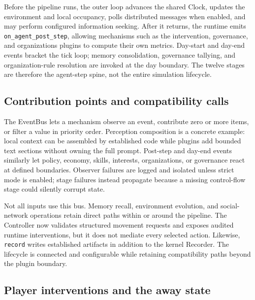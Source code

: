 Before the pipeline runs, the outer loop advances the shared Clock, updates
the environment and local occupancy, polls distributed messages when enabled,
and may perform configured information seeking.  After it returns, the
runtime emits \texttt{on\_agent\_post\_step}, allowing mechanisms such as the
intervention, governance, and organizations plugins to compute their own
metrics.  Day-start and day-end events bracket the tick loop; memory
consolidation, governance tallying, and organization-rule resolution are
invoked at the day boundary.  The twelve stages are therefore the agent-step
spine, not the entire simulation lifecycle.

\subsection{Contribution points and compatibility calls}

The EventBus lets a mechanism observe an event, contribute zero or more items,
or filter a value in priority order.  Perception composition is a concrete
example: local context can be assembled by established code while plugins add
bounded text sections without owning the full prompt.  Post-step and day-end
events similarly let policy, economy, skills, interests, organizations, or
governance react at defined boundaries.  Observer failures are logged and
isolated unless strict mode is enabled; stage failures instead propagate
because a missing control-flow stage could silently corrupt state.

Not all inputs use this bus.  Memory recall, environment evolution, and
social-network operations retain direct paths within or around the pipeline.
The Controller now validates structured movement requests and exposes audited
runtime interventions, but it does not mediate every selected action.
Likewise, \texttt{record} writes established artifacts in addition to the
kernel Recorder.  The lifecycle is connected and configurable while retaining
compatibility paths beyond the plugin boundary.

\subsection{Player interventions and the away state}

